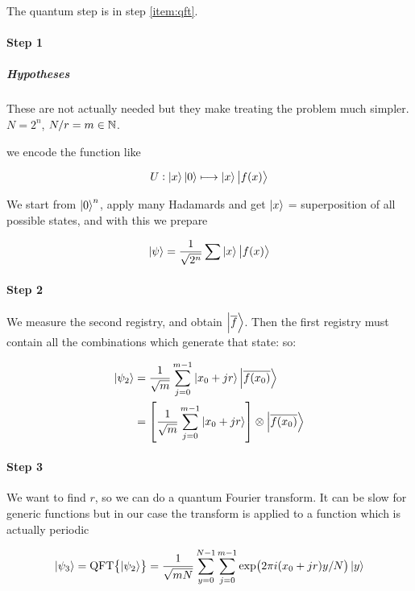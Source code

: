 The quantum step is in step \ref{item:qft}.


\paragraph{Step 1}

\subparagraph{Hypotheses} These are not actually needed but they make treating the problem much simpler. \( N = 2^n \), \( N/r = m \in \mathbb{N} \).

we encode the function like

\begin{equation}
   U: \ket{x}\ket{0} \longmapsto \ket{x} \ket{f(x)}
\end{equation}

We start from \( \ket{0}^n \), apply many Hadamards and get \( \ket{x} \) = superposition of all possible states, and with this
we prepare

\begin{equation}
  \ket{\psi} = \frac{1}{\sqrt{2^n}} \sum \ket{x} \ket{f(x)}
\end{equation}

\paragraph{Step 2}

We measure the second registry, and obtain \( \ket{\overline{f}} \). Then the first registry must contain all the combinations which generate that state: so:

\begin{subequations}
\begin{align}
  \ket{\psi_2}
  &= \frac{1}{\sqrt{m}}\sum _{j=0} ^{m-1} \ket{x_0 + jr} \ket{\overline{f(x_0)}}  \\
  &= \qty[\frac{1}{\sqrt{m}}\sum _{j=0} ^{m-1} \ket{x_0 + jr} ] \otimes \ket{\overline{f(x_0)}}
\end{align}
\end{subequations}

\paragraph{Step 3}

We want to find \( r \), so we can do a quantum Fourier transform. It can be slow for generic functions but in our case the transform is applied to a function which is actually periodic

\begin{equation}
  \ket{\psi _3} = \text{QFT}\qty{\ket{\psi_2}} = \frac{1}{\sqrt{mN}} \sum _{y=0} ^{N-1} \sum _{j=0} ^{m-1} \exp(2 \pi i (x_0 + jr) y/N) \ket{y}
\end{equation}

